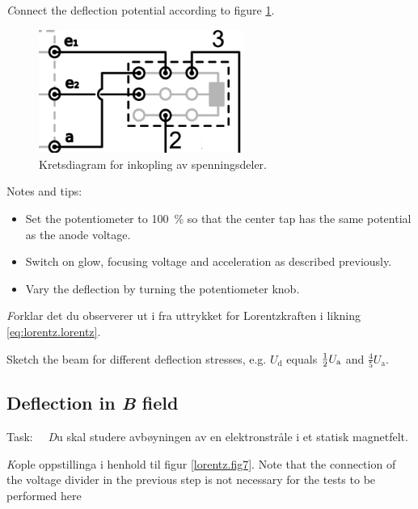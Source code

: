 \documentclass[../Elmag-labhefte-2020.tex]{subfiles}
\begin{document}
{\emph Connect the deflection potential according to figure \ref{fig:spenningsdeler}.}
 
\begin{figure}[!ht]
\RawFloats
    \begin{center}
    \includegraphics[width=0.6\textwidth]{fig/spenningsdeler-new.pdf}
    \caption{%
        Kretsdiagram for inkopling av spenningsdeler.
    }
    \label{fig:spenningsdeler}
    \end{center}
\end{figure}

Notes and tips:
\vspace{-4mm}
\begin{itemize}
    \item Set the potentiometer to \SI{100}{\percent} so that the center tap has the same potential as the anode voltage.
    \item Switch on glow, focusing voltage and acceleration as described previously.
    \item Vary the deflection by turning the potentiometer knob.
\end{itemize}

{\emph Forklar det du observerer ut i fra uttrykket for Lorentzkraften i likning \eqref{eq:lorentz.lorentz}.

Sketch the beam for different deflection stresses, e.g. $U_\mathrm{d}$ equals $\frac{1}{2}  U_\mathrm{a}$ and $\frac{4}{5} U_\mathrm{a}$.
}

 
\subsection{Deflection in \textsl{B} field}

Task: \ \
{\emph Du skal studere avbøyningen av en elektronstråle i et statisk magnetfelt.}


{\emph Kople oppstillinga i henhold til figur \ref{lorentz.fig7}. Note that the connection of the voltage divider in the previous step is not necessary for the tests to be performed here}
\end{document}
